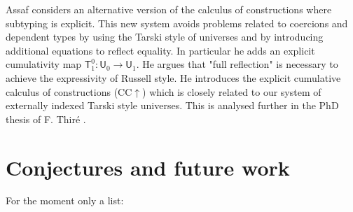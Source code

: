 \documentclass[11pt,a4paper]{article}
\theoremstyle{definition}
\newcommand{\UU}{\mathsf{U}}
\newcommand{\T}{\mathsf{T}}
\begin{document}




Assaf \cite{Assaf14} considers an alternative version of the calculus of
constructions where subtyping is explicit. This new system avoids problems related to coercions and dependent types by using the Tarski style
of universes and by introducing additional equations to reflect equality. In particular he adds an explicit cumulativity map $\T^0_1 : \UU_0 \to \UU_1$. He argues that "full reflection" is necessary to achieve the expressivity of Russell style. He introduces the explicit cumulative calculus of constructions (CC$\uparrow$) which is closely related to our system of externally indexed Tarski style universes.
This is analysed further in the PhD thesis of F. Thir\'e \cite{Thire20}.

\section{Conjectures and future work}\label{sec:future}

For the moment only a list:
\end{document}
